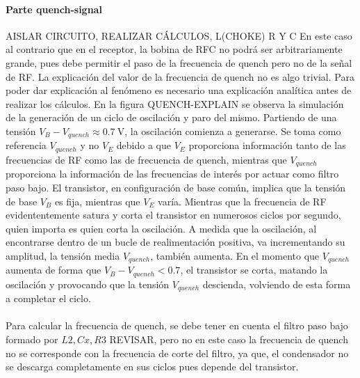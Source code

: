 \paragraph{Parte quench-signal} AISLAR CIRCUITO, REALIZAR C\'ALCULOS, L(CHOKE) R Y C
En este caso al contrario que en el receptor, la bobina de RFC no podrá ser arbitrariamente grande, pues debe permitir el paso de la frecuencia de quench pero no de la señal de RF.
La explicación del valor de la frecuencia de quench no es algo trivial. Para poder dar explicación al fenómeno es necesario una explicación analítica antes de realizar los cálculos.
En la figura QUENCH-EXPLAIN se observa la simulación de la generación de un ciclo de oscilación y paro del mismo. Partiendo de una tensión $V_B - V_{quench} \approx \SI{0.7}{\volt}$, la oscilación comienza a generarse. Se toma como referencia $V_{quench}$ y no $V_E$ debido a que $V_E$ proporciona información tanto de las frecuencias de RF como las de frecuencia de quench, mientras que $V_{quench}$ proporciona la información de las frecuencias de interés por actuar como filtro paso bajo. 
El transistor, en configuración de base común, implica que la tensión de base $V_B$ es fija, mientras que $V_E$ varía. Mientras que la frecuencia de RF evidententemente satura y corta el transistor en numerosos ciclos por segundo, quien importa es quien corta la oscilación. A medida que la oscilación, al encontrarse dentro de un bucle de realimentación positiva, va incrementando su amplitud, la tensión media $V_{quench}$, también aumenta. En el momento que $V_{quench}$ aumenta de forma que $V_B - V_{quench} < 0.7$, el transistor se corta, matando la oscilación y provocando que la tensión $V_{quench}$ descienda, volviendo de esta forma a completar el ciclo.
\paragraph{}
Para calcular la frecuencia de quench, se debe tener en cuenta el filtro paso bajo formado por $L2, Cx, R3$ REVISAR, pero no en este caso la frecuencia de quench no se corresponde con la frecuencia de corte del filtro, ya que, el condensador no se descarga completamente en sus ciclos pues depende del transistor. 

